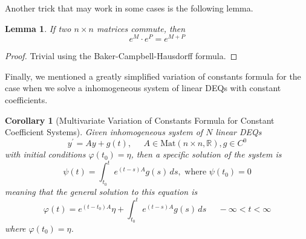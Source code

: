 \documentclass{article}
\newtheorem{lemma}[theorem]{Lemma}
\newtheorem{corollary}{Corollary}[theorem]
\theoremstyle{remark}
\theoremstyle{definition}
\begin{document}
Another trick that may work in some cases is the following lemma. 

\begin{lemma}
If two $n \times n$ matrices commute, then
\[e^{M} \cdot e^{P} = e^{M + P} \]
\end{lemma}
\begin{proof}
Trivial using the Baker-Campbell-Hausdorff formula. 
\end{proof}

Finally, we mentioned a greatly simplified variation of constants formula for the case when we solve a inhomogeneous system of linear DEQs with constant coefficients. 

\begin{corollary}[Multivariate Variation of Constants Formula for Constant Coefficient Systems]
Given inhomogeneous system of $N$ linear DEQs 
\[y^\prime = A y + g(t), \;\;\;\;\; A \in \text{Mat}(n \times n, \mathbb{R}), g \in C^0\]
with initial conditions $\varphi(t_0) = \eta$, then a specific solution of the system is 
\[\psi (t) = \int_{t_0}^t e^{(t-s)A} g(s) \,ds , \text{ where } \psi(t_0) = 0\]
meaning that the general solution to this equation is 
\[\varphi(t) = e^{(t - t_0)A} \eta + \int_{t_0}^t e^{(t-s)A} g(s) \,ds \;\;\;\;\; -\infty < t< \infty\]
where $\varphi(t_0) = \eta$. 
\end{corollary}
\end{document}
